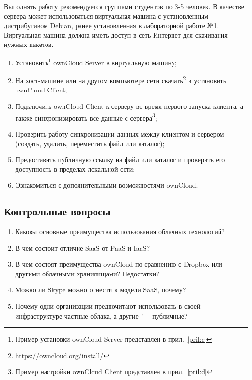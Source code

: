 Выполнять работу рекомендуется группами студентов по 3-5 человек.
В качестве сервера может использоваться виртуальная машина с установленным дистрибутивом Debian, ранее установленная в лабораторной работе №1.
Виртуальная машина должна иметь доступ в сеть Интернет для скачивания нужных пакетов.

\begin{enumerate}
    \item Установить\footnote{Пример установки ownCloud Server представлен в прил.~\ref{pril:c}} ownCloud Server в виртуальную машину;
    \item На хост-машине или на другом компьютере сети скачать\footnote{\url{https://owncloud.org/install/}} и установить ownCloud Client;
    \item Подключить ownCloud Client к серверу во время первого запуска клиента, а также синхронизировать все данные с сервера\footnote{Пример настройки ownCloud Client представлен в прил.~\ref{pril:d}};
    \item Проверить работу синхронизации данных между клиентом и сервером (создать, удалить, переместить файл или каталог);
    \item Предоставить публичную ссылку на файл или каталог и проверить его доступность в пределах локальной сети;
    \item Ознакомиться с дополнительными возможностями ownCloud.
\end{enumerate}

\subsection{Контрольные вопросы}
\begin{enumerate}
    \item Каковы основные преимущества использования облачных технологий?
    \item В чем состоит отличие SaaS от PaaS и IaaS?
    \item В чем состоят преимущества ownCloud по сравнению с Dropbox или другими облачными хранилищами? Недостатки?
    \item Можно ли Skype можно отнести к модели SaaS, почему?
    \item Почему одни организации предпочитают использовать в своей инфраструктуре частные облака, а другие "--- публичные?
\end{enumerate}

\clearpage
